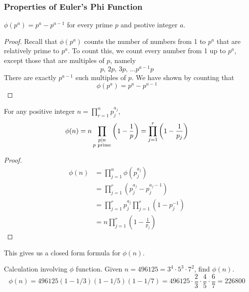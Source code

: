 \subsubsection{Properties of Euler's Phi Function}

\begin{theorem}
    $\phi(p^a) = p^a - p^{a-1}$ for every prime $p$ and psotive integer $a$.
\end{theorem}
\begin{proof}
    Recall that $\phi(p^a)$ counts the number of numbers from 1 to $p^a$ that are relatively prime to $p^a$. To count this, we count every number from 1 up to $p^a$, except those that are multiples of $p$, namely
    $$
    p,\, 2p,\, 3p,\, \ldots p^{a-1}p
    $$
    There are exactly $p^{a-1}$ such multiples of $p$. We have shown by counting that
    $$
    \phi(p^a) = p^a - p^{a-1}
    $$
\end{proof}

\begin{theorem}
    For any positive integer $n = \prod_{r=1}^n p_j^{a_j}$,
    $$
    \phi(n) = n \prod_{\substack{p \mathrel{\mid} n \\ \text{$p$ prime}}} \left( 1 - \frac{1}{p} \right) = \prod_{j=1}^r \left( 1-\frac{1}{p_j} \right) 
    $$
\end{theorem}

\begin{proof}
    $$
    \begin{aligned}
        \phi(n) &= \prod_{j=1}^n \phi(p_j^{a_j}) \\
        &= \prod_{j=1}^r (p_j^{a_j} - p_j^{a_j - 1}) \\
        &= \prod_{j=1}^r p_j^{a_j} \prod_{j=1}^r (1 - p_j^{-1}) \\
        &= n \prod_{j=1}^r \left( 1 - \frac{1}{p_j} \right) 
    \end{aligned}
    $$
\end{proof}

This gives us a closed form formula for $\phi(n)$.

\begin{example}
    Calculation involving $\phi$ function. Given $n = 496125 = 3^4 \cdot 5^3 \cdot 7^2$, find $\phi(n)$.
    $$
    \phi(n) = 496125 (1 - 1 / 3) (1 - 1 / 5) (1 - 1 / 7) = 496125 \cdot \frac{2}{3} \cdot \frac{4}{5} \cdot \frac{6}{7} = 226800
    $$
\end{example}

